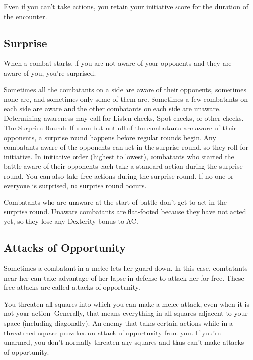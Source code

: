 Even if you can't take actions, you retain your initiative score for the duration of the encounter.

\subsection{Surprise}

When a combat starts, if you are not aware of your opponents and they are aware of you, you're surprised.

\vspace*{10pt}


Sometimes all the combatants on a side are aware of their opponents, sometimes none are, and sometimes only some of them are. Sometimes a few combatants on each side are aware and the other combatants on each side are unaware.
Determining awareness may call for Listen checks, Spot checks, or other checks.
The Surprise Round: If some but not all of the combatants are aware of their opponents, a surprise round happens before regular rounds begin. Any combatants aware of the opponents can act in the surprise round, so they roll for initiative. In initiative order (highest to lowest), combatants who started the battle aware of their opponents each take a standard action during the surprise round. You can also take free actions during the surprise round. If no one or everyone is surprised, no surprise round occurs.

\vspace*{10pt}

Combatants who are unaware at the start of battle don't get to act in the surprise round. Unaware combatants are flat-footed because they have not acted yet, so they lose any Dexterity bonus to AC.

\subsection{Attacks of Opportunity}

Sometimes a combatant in a melee lets her guard down. In this case, combatants near her can take advantage of her lapse in defense to attack her for free. These free attacks are called attacks of opportunity.

\vspace*{10pt}

You threaten all squares into which you can make a melee attack, even when it is not your action. Generally, that means everything in all squares adjacent to your space (including diagonally). An enemy that takes certain actions while in a threatened square provokes an attack of opportunity from you. If you're unarmed, you don't normally threaten any squares and thus can't make attacks of opportunity.

